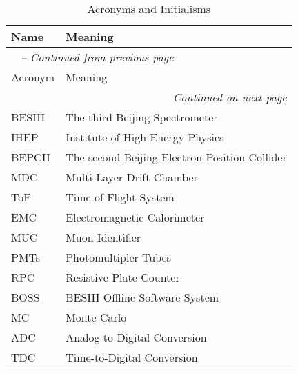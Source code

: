 \begin{longtable}{p{} p{}}
\caption{Acronyms and Initialisms}
\label{tab:acronyms} \\

\toprule
Name & Meaning \\
\midrule
\endfirsthead

\multicolumn{2}{l}{\textit{\tablename\ \thetable{} -- Continued from previous page}} \\
\toprule
Acronym & Meaning \\
\midrule
\endhead

\multicolumn{2}{r}{\textit{Continued on next page}} \\
\bottomrule
\endfoot

\bottomrule
\endlastfoot


    BESIII & The third Beijing Spectrometer \\
    IHEP   & Institute of High Energy Physics \\
    BEPCII & The second Beijing Electron-Position Collider \\
    MDC    & Multi-Layer Drift Chamber \\
    ToF    & Time-of-Flight System \\
    EMC    & Electromagnetic Calorimeter \\
    MUC    & Muon Identifier \\
    PMTs   & Photomultipler Tubes \\
    RPC    & Resistive Plate Counter \\
    BOSS   & BESIII Offline Software System \\
    MC     & Monte Carlo \\
    ADC    & Analog-to-Digital Conversion \\
    TDC    & Time-to-Digital Conversion \\
\end{longtable}
